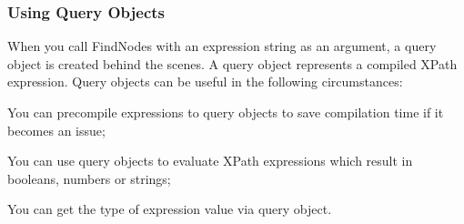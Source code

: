  \hypertarget{XMLManual_XMLXPathQuery}{}\subsubsection{Using Query Objects}\label{XMLManual_XMLXPathQuery}
When you call FindNodes with an expression string as an argument, a query object is created behind the scenes. A query object represents a compiled XPath expression. Query objects can be useful in the following circumstances:
\begin{DoxyItemize}
\item You can precompile expressions to query objects to save compilation time if it becomes an issue;
\item You can use query objects to evaluate XPath expressions which result in booleans, numbers or strings;
\item You can get the type of expression value via query object.
\end{DoxyItemize}

